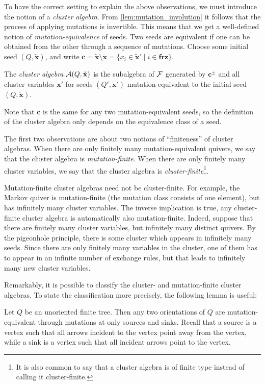 \documentclass{article}
\newcommand{\frz}{\mathbf{frz}}
\newcommand{\bx}{\mathbf{x}}
\newcommand{\tbx}{\tilde{\bx}}
\begin{document}
To have the correct setting to explain the above observations, we must introduce the
notion of a \emph{cluster algebra}. From
\cref{lem:mutation_involution} it follows that the process of applying mutations is
invertible. This means that we get a well-defined notion of
\emph{mutation-equivalence} of seeds. Two seeds are
equivalent if one can be obtained from the other through a sequence of mutations.
Choose some initial seed $(Q, \tbx)$, and write $\mathbf{c} = \tbx \setminus \bx =
	\{x_i \in \tbx' \mid i \in \frz\}$.
\begin{definition}
	The \emph{cluster algebra} $\mcA (Q, \tbx)$ is the subalgebra of $\mathcal{F}$ generated by
	$\mathbf{c}^\pm$ and all cluster variables $\bx'$ for seeds $(Q', \tbx')$
	mutation-equivalent to the initial seed $(Q, \tbx)$.
\end{definition}
\begin{remark}
	Note that
	$\mathbf{c}$ is the same for any two mutation-equivalent seeds, so the definition of
	the cluster algebra only depends on the equivalence class of a seed.
\end{remark}

The first two observations are about two notions of ``finiteness'' of cluster algebras.
When there are only finitely many mutation-equivalent quivers, we say that the cluster
algebra is \emph{mutation-finite}. When there are only finitely
many cluster variables, we say that the cluster algebra is
\emph{cluster-finite}\footnote{It is also common to say that a
	cluster algebra is of finite type instead of calling it cluster-finite.}.

Mutation-finite cluster algebras need not be cluster-finite. For example, the Markov
quiver is mutation-finite (the mutation class consists of one element), but has
infinitely many cluster variables. The inverse implication is true, any cluster-finite
cluster algebra is automatically also mutation-finite. Indeed, suppose that there are
finitely many cluster variables, but infinitely many distinct quivers. By the
pigeonhole principle, there is some cluster which appears in infinitely many seeds.
Since there are only finitely many variables in the cluster, one of them has to appear
in an infinite number of exchange rules, but that leads to infinitely many new cluster
variables.

Remarkably, it is possible to classify the cluster- and mutation-finite cluster
algebras. To state the classification more precisely, the following lemma is useful:
\begin{lemma}
	Let $Q$ be an unoriented finite tree. Then any two orientations of $Q$ are mutation-equivalent through mutations at only sources and sinks. Recall that a source is a vertex such that all arrows incident to the vertex point away from the vertex, while a sink is a vertex such that all incident arrows point to the vertex.
\end{lemma}
\end{document}
